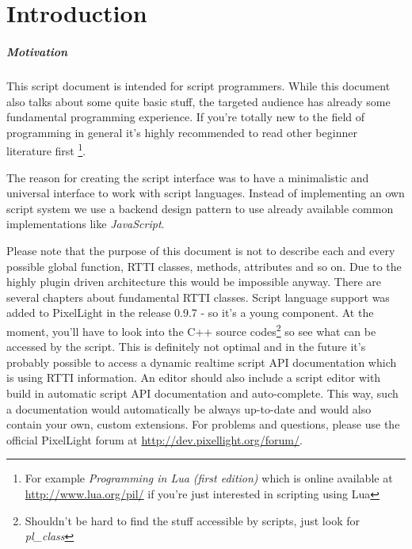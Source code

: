 \chapter{Introduction}


\paragraph{Motivation}
This script document is intended for script programmers. While this document also talks about some quite basic stuff, the targeted audience has already some fundamental programming experience. If you're totally new to the field of programming in general it's highly recommended to read other beginner literature first \footnote{For example \emph{Programming in Lua (first edition)} which is online available at \url{http://www.lua.org/pil/} if you're just interested in scripting using Lua}.

The reason for creating the script interface was to have a minimalistic and universal interface to work with script languages. Instead of implementing an own script system we use a backend design pattern to use already available common implementations like \emph{JavaScript}.

Please note that the purpose of this document is not to describe each and every possible global function, RTTI classes, methods, attributes and so on. Due to the highly plugin driven architecture this would be impossible anyway. There are several chapters about fundamental RTTI classes. Script language support was added to PixelLight in the release 0.9.7 - so it's a young component. At the moment, you'll have to look into the C++ source codes\footnote{Shouldn't be hard to find the stuff accessible by scripts, just look for \emph{pl\_class}} so see what can be accessed by the script. This is definitely not optimal and in the future it's probably possible to access a dynamic realtime script API documentation which is using RTTI information. An editor should also include a script editor with build in automatic script API documentation and auto-complete. This way, such a documentation would automatically be always up-to-date and would also contain your own, custom extensions. For problems and questions, please use the official PixelLight forum at \url{http://dev.pixellight.org/forum/}.

